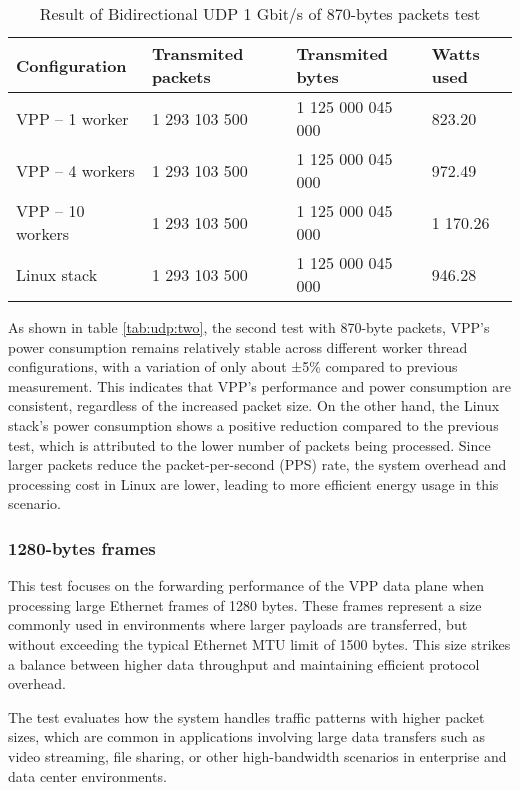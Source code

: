 \begin{table}[h!]
\centering
\begin{tabular}{|l|l|l|l|}
\hline
\textbf{Configuration} & \textbf{Transmited packets} & \textbf{Transmited bytes} & \textbf{Watts used} \\
\hline
VPP -- 1 worker & 1 293 103 500 & 1 125 000 045 000 & 823.20\\
VPP -- 4 workers & 1 293 103 500 & 1 125 000 045 000 & 972.49\\
VPP -- 10 workers & 1 293 103 500 & 1 125 000 045 000 & 1 170.26\\
Linux stack & 1 293 103 500 & 1 125 000 045 000 & 946.28\\
\hline
\end{tabular}
\caption{Result of Bidirectional UDP 1 Gbit/s of 870-bytes packets test}
\label{tab:udp:three}
\end{table}

As shown in table \ref{tab:udp:two}, the second test with 870-byte packets, 
VPP's power consumption remains relatively stable across different worker thread configurations, with a variation of only about ±5\% compared to previous measurement. 
This indicates that VPP's performance and power consumption are consistent, regardless of the increased packet size. 
On the other hand, the Linux stack's power consumption shows a positive reduction compared to the previous test, which is attributed to the lower number of packets being processed. 
Since larger packets reduce the packet-per-second (PPS) rate, the system overhead and processing cost in Linux are lower, leading to more efficient energy usage in this scenario.

\subsubsection{1280-bytes frames}
This test focuses on the forwarding performance of the VPP data plane when processing large Ethernet frames of 1280 bytes. 
These frames represent a size commonly used in environments where larger payloads are transferred, but without exceeding the typical Ethernet MTU limit of 1500 bytes. 
This size strikes a balance between higher data throughput and maintaining efficient protocol overhead.

The test evaluates how the system handles traffic patterns with higher packet sizes, which are common in applications involving large data transfers such as video streaming, 
file sharing, or other high-bandwidth scenarios in enterprise and data center environments.

